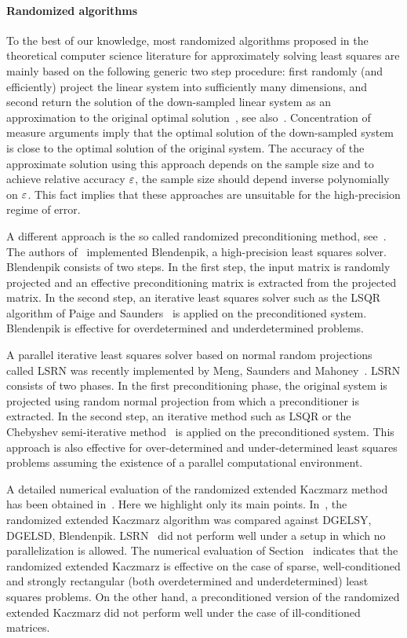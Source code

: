 \paragraph{Randomized algorithms}
To the best of our knowledge, most randomized algorithms proposed in the theoretical computer science literature for approximately solving least squares are mainly based on the following generic two step procedure: first randomly (and efficiently) project the linear system into sufficiently many dimensions, and second return the solution of the down-sampled linear system as an approximation to the original optimal solution~\cite{petrosSODA06,sarlos,CW09,fasterLS}, see also~\cite{ls:nnzA}. Concentration of measure arguments imply that the optimal solution of the down-sampled system is close to the optimal solution of the original system. The accuracy of the approximate solution using this approach depends on the sample size and to achieve relative accuracy $\varepsilon$, the sample size should depend inverse polynomially on $\varepsilon$. This fact implies that these approaches are unsuitable for the high-precision regime of error.

A different approach is the so called randomized preconditioning method, see~\cite{RT08,AMT10}. The authors of~\cite{AMT10} implemented Blendenpik, a high-precision least squares solver. Blendenpik consists of two steps. In the first step, the input matrix is randomly projected and an effective preconditioning matrix is extracted from the projected matrix. In the second step, an iterative least squares solver such as the LSQR algorithm of Paige and Saunders~\cite{PS82} is applied on the preconditioned system. Blendenpik is effective for overdetermined and underdetermined problems.

A parallel iterative least squares solver based on normal random projections called LSRN was recently implemented by Meng, Saunders and Mahoney~\cite{lsrn}. LSRN consists of two phases. In the first preconditioning phase, the original system is projected using random normal projection from which a preconditioner is extracted. In the second step, an iterative method such as LSQR or the Chebyshev semi-iterative method~\cite{Chebyshev} is applied on the preconditioned system. This approach is also effective for over-determined and under-determined least squares problems assuming the existence of a parallel computational environment.
%

%
A detailed numerical evaluation of the randomized extended Kaczmarz method has been obtained in~\cite{REK}. Here we highlight only its main points. In~\cite{REK}, the randomized extended Kaczmarz algorithm was compared against DGELSY, DGELSD, Blendenpik. LSRN~\cite{lsrn} did not perform well under a setup in which no parallelization is allowed. The numerical evaluation of Section~\cite[Section 5]{REK} indicates that the randomized extended Kaczmarz
is effective on the case of sparse, well-conditioned and strongly rectangular (both overdetermined and underdetermined) least squares problems. On the other hand, a preconditioned version of the randomized extended Kaczmarz did not perform well under the case of ill-conditioned matrices.
%
